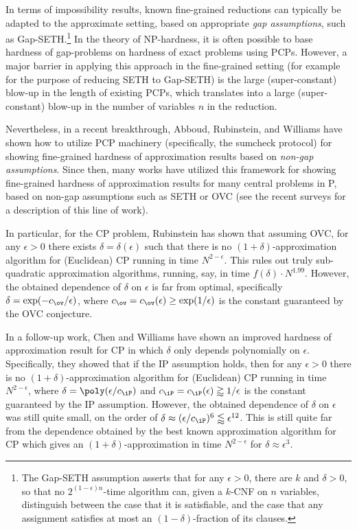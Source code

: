 \documentclass[11pt]{article}
\begin{document}
In terms of impossibility results, known fine-grained reductions can typically be adapted to the approximate setting, based on appropriate 
\emph{gap assumptions},  such as Gap-SETH.\footnote{ The Gap-SETH assumption asserts that for any $\epsilon>0$, there are $k$ and $\delta >0$,  so that no $2^{(1-\epsilon)n}$-time algorithm can, given a $k$-CNF on $n$ variables, distinguish between the case that it is satisfiable, and the case that any assignment satisfies at most an $(1-\delta)$-fraction of its clauses.} 
 In the theory of NP-hardness, it is often possible to base hardness of gap-problems on hardness of exact  problems using PCPs. However, a major barrier  in applying this approach in the fine-grained setting (for example for the purpose of reducing  SETH to Gap-SETH) is the large (super-constant) blow-up in the length of existing PCPs, which translates into a large (super-constant) blow-up in the number of variables $n$ in the reduction. 

Nevertheless, in a recent breakthrough, Abboud, Rubinstein, and Williams \cite{ARW17}   have shown how to utilize PCP machinery (specifically, the sumcheck protocol) for showing fine-grained hardness of approximation results based on \emph{non-gap assumptions}. Since then,  
many works have utilized this framework for showing fine-grained hardness of approximation results for many central problems in P, based on non-gap assumptions such as SETH or OVC 
(see the recent surveys \cite{RW19, FSLM20} for a description of this line of work). 

In particular, for the CP problem, Rubinstein \cite{Rub18} has shown that assuming OVC, for any $\epsilon >0$ there exists $\delta = \delta(\epsilon)$ such that there is no 
$(1+\delta)$-approximation algorithm for (Euclidean)  CP running in time $N^{2-\epsilon}$. This rules out truly sub-quadratic approximation algorithms, running, say, in time $f(\delta) \cdot N^{1.99}$.  However, the obtained dependence of $\delta$ on $\epsilon$ is far from optimal, specifically
$\delta =\exp(- c_{\ov}/\epsilon)$, where $c_{\ov}=c_{\ov}(\epsilon) \geq \exp(1/\epsilon)$ is the constant guaranteed by the OVC conjecture.

In a follow-up work, Chen and Williams \cite{CW19} have shown an improved hardness of approximation result for CP in which $\delta$ only depends polynomially on $\epsilon$. Specifically, they showed that if the IP assumption holds, then for any $\epsilon>0$ there is no 
$(1+\delta)$-approximation algorithm for (Euclidean) CP running in time $N^{2-\epsilon}$, where $\delta = \poly(\epsilon/c_{\iP})$ and $c_{\iP} = c_{\iP}(\epsilon) \gtrapprox 1/\epsilon$  is the constant guaranteed by the IP assumption.
However, the obtained dependence of $\delta$ on $\epsilon$ was still quite small, on the order of $\delta \approx (\epsilon/c_{\iP})^6 \lessapprox \epsilon^{12}$. This is still quite far from the dependence obtained by the best known approximation algorithm for CP which gives an $(1+\delta)$-approximation in time $N^{2-\epsilon}$ for $\delta \approx \epsilon^3$.
\end{document}
